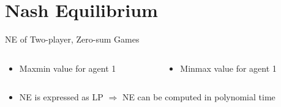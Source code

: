 \documentclass[11pt,aspectratio=169,handout]{beamer}
\begin{document}
 \section{Nash Equilibrium}
  \begin{frame}{NE of Two-player, Zero-sum Games}
   \begin{columns}
   \hspace{0.5em}
    \begin{column}{0.49\textwidth}
     \begin{itemize}
      \item<1-> Maxmin value for agent 1
      \vspace{0.5em}
     \end{itemize}     
    \end{column}
    \begin{column}{0.49\textwidth}
     \begin{itemize}
      \item<3-> Minmax value for agent 1
      \vspace{0.5em}
     \end{itemize}
    \end{column}
   \end{columns}
   \begin{itemize}
    \item<5-> NE is expressed as \alert{LP} $\Rightarrow$ NE can be computed in \alert{polynomial time}
   \end{itemize}
  \end{frame}
  
\end{document}
